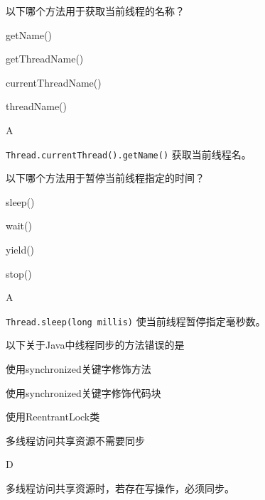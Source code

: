 \begin{question}
	以下哪个方法用于获取当前线程的名称？
	\begin{options}
		\item getName()
		\item getThreadName()
		\item currentThreadName()
		\item threadName()
	\end{options}
	\begin{answer}
		A
	\end{answer}
	\begin{explanation}
		\texttt{Thread.currentThread().getName()} 获取当前线程名。
	\end{explanation}
\end{question}

\begin{question}
	以下哪个方法用于暂停当前线程指定的时间？
	\begin{options}
		\item sleep()
		\item wait()
		\item yield()
		\item stop()
	\end{options}
	\begin{answer}
		A
	\end{answer}
	\begin{explanation}
		\texttt{Thread.sleep(long millis)} 使当前线程暂停指定毫秒数。
	\end{explanation}
\end{question}

\begin{question}
	以下关于Java中线程同步的方法错误的是
	\begin{options}
		\item 使用synchronized关键字修饰方法
		\item 使用synchronized关键字修饰代码块
		\item 使用ReentrantLock类
		\item 多线程访问共享资源不需要同步
	\end{options}
	\begin{answer}
		D
	\end{answer}
	\begin{explanation}
		多线程访问共享资源时，若存在写操作，必须同步。
	\end{explanation}
\end{question}

